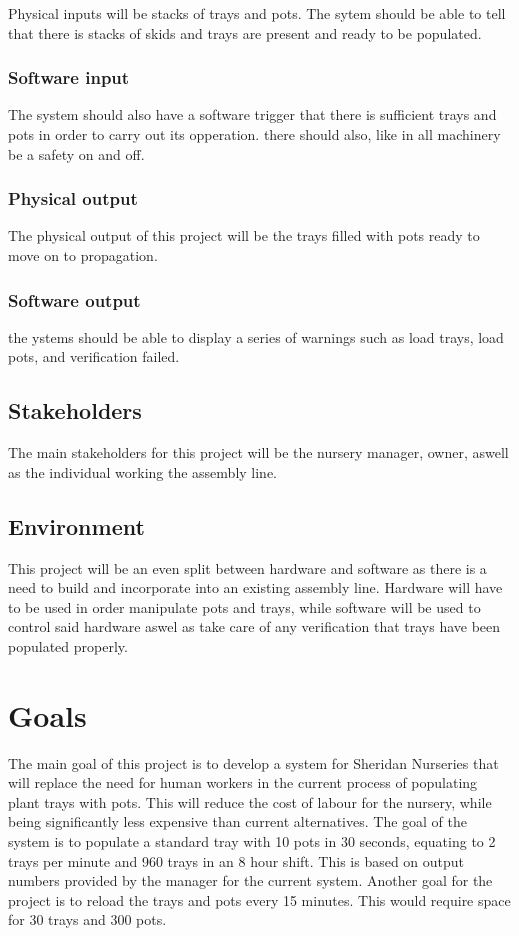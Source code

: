 \documentclass{article}
\begin{document}
Physical inputs will be stacks of trays and pots. The sytem should be able to tell that there is stacks of skids and trays are present and
ready to be populated.
\subsubsection{Software input}
The system should also have a software trigger that there is sufficient trays and pots in order to carry out its opperation. there should also, like in all machinery be a safety on and off.
\subsubsection{Physical output}
The physical output of this project will be the trays filled with pots ready to move on to propagation.
\subsubsection{Software output}
the ystems should be able to display a series of warnings such as load trays, load pots, and verification failed.


\subsection{Stakeholders}
The main stakeholders for this project will be the nursery manager, owner, aswell as the individual working the assembly line.

\subsection{Environment}
This project will be an even split between hardware and software as there is a need to build and incorporate into an existing assembly line.
Hardware will have to be used in order manipulate pots and trays, while software will be used to control said hardware 
aswel as take care of any verification that trays have been populated properly.
\section{Goals}
The main goal of this project is to develop a system for Sheridan Nurseries
that will replace the need for human workers in the current process of populating plant trays with pots. This will reduce the cost
of labour for the nursery, while being significantly less expensive than current alternatives. The goal of the system is to populate 
a standard tray with 10 pots in 30 seconds, equating to 2 trays per minute and 960 trays in an 8 hour shift. This is based on output 
numbers provided by the manager for the current system. Another goal for the project is to reload the trays and pots every 15 minutes.
This would require space for 30 trays and 300 pots.
\end{document}
